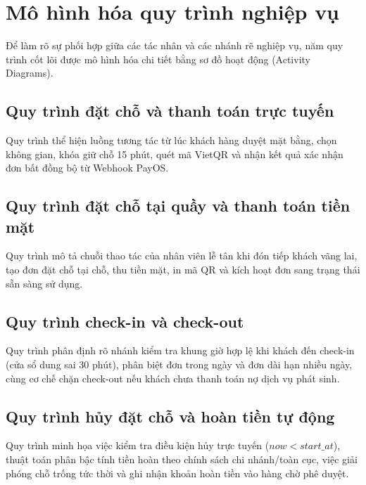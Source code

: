 \clearpage
\section{Mô hình hóa quy trình nghiệp vụ}
\label{sec:activity}

Để làm rõ sự phối hợp giữa các tác nhân và các nhánh rẽ nghiệp vụ, năm quy trình cốt lõi được mô hình hóa chi tiết bằng sơ đồ hoạt động (Activity Diagrams).

\subsection{Quy trình đặt chỗ và thanh toán trực tuyến}
Quy trình thể hiện luồng tương tác từ lúc khách hàng duyệt mặt bằng, chọn không gian, khóa giữ chỗ 15 phút, quét mã VietQR và nhận kết quả xác nhận đơn bất đồng bộ từ Webhook PayOS.


\subsection{Quy trình đặt chỗ tại quầy và thanh toán tiền mặt}
Quy trình mô tả chuỗi thao tác của nhân viên lễ tân khi đón tiếp khách vãng lai, tạo đơn đặt chỗ tại chỗ, thu tiền mặt, in mã QR và kích hoạt đơn sang trạng thái sẵn sàng sử dụng.


\subsection{Quy trình check-in và check-out}
Quy trình phân định rõ nhánh kiểm tra khung giờ hợp lệ khi khách đến check-in (cửa sổ dung sai 30 phút), phân biệt đơn trong ngày và đơn dài hạn nhiều ngày, cùng cơ chế chặn check-out nếu khách chưa thanh toán nợ dịch vụ phát sinh.


\subsection{Quy trình hủy đặt chỗ và hoàn tiền tự động}
Quy trình minh họa việc kiểm tra điều kiện hủy trực tuyến ($now < start\_at$), thuật toán phân bậc tính tiền hoàn theo chính sách chi nhánh/toàn cục, việc giải phóng chỗ trống tức thời và ghi nhận khoản hoàn tiền vào hàng chờ phê duyệt.

